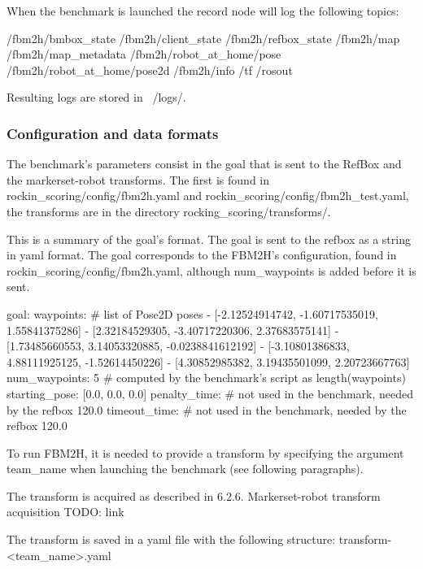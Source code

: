 \documentclass[a4paper]{article}
\begin{document}

When the benchmark is launched the record node will log the following topics:

/fbm2h/bmbox_state
/fbm2h/client_state
/fbm2h/refbox_state
/fbm2h/map
/fbm2h/map_metadata
/fbm2h/robot_at_home/pose
/fbm2h/robot_at_home/pose2d
/fbm2h/info
/tf
/rosout

Resulting logs are stored in ~/logs/.

\clearpage

\subsubsection{Configuration and data formats}

The benchmark's parameters consist in the goal that is sent to the RefBox and the markerset-robot transforms.
The first is found in rockin_scoring/config/fbm2h.yaml and rockin_scoring/config/fbm2h_test.yaml, the transforms are in the directory rocking_scoring/transforms/.



This is a summary of the goal's format. The goal is sent to the refbox as a string in yaml format.
The goal corresponds to the FBM2H's configuration, found in rockin_scoring/config/fbm2h.yaml, although num_waypoints is added before it is sent.

goal:
  waypoints: # list of Pose2D poses
  - [-2.12524914742, -1.60717535019, 1.55841375286]
  - [2.32184529305, -3.40717220306, 2.37683575141]
  - [1.73485660553, 3.14053320885, -0.0238841612192]
  - [-3.10801386833, 4.88111925125, -1.52614450226]
  - [4.30852985382, 3.19435501099, 2.20723667763]
  num_waypoints: 5 # computed by the benchmark's script as length(waypoints)
  starting_pose:
    [0.0, 0.0, 0.0]
  penalty_time: # not used in the benchmark, needed by the refbox
    120.0
  timeout_time: # not used in the benchmark, needed by the refbox
    120.0



To run FBM2H, it is needed to provide a transform by specifying the argument team_name when launching the benchmark (see following paragraphs).

The transform is acquired as described in 6.2.6. Markerset-robot transform acquisition TODO: link

The transform is saved in a yaml file with the following structure:
transform-<team_name>.yaml
\end{document}
